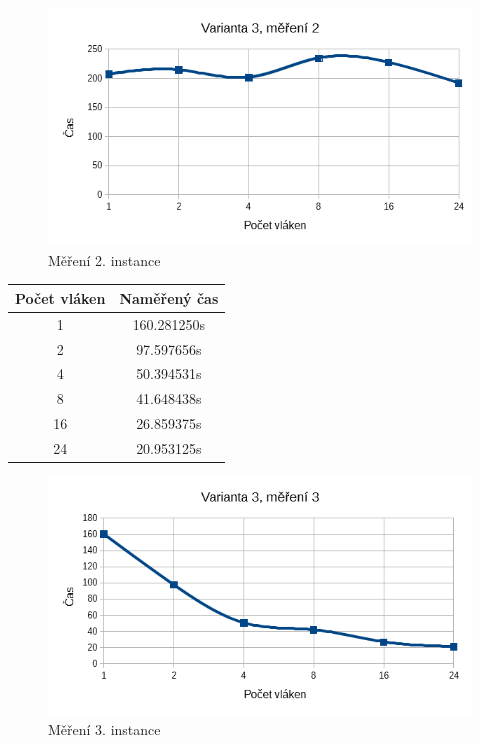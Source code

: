 \documentclass[12pt]{article}
\begin{document}
\begin{figure}[t]
  \begin{center}
      \includegraphics[width=12cm]{images/ssef2.png}
    \caption{Měření 2. instance} 
  \end{center}
\end{figure}




\begin{center}
\begin{tabular}{ c | c }
\textbf{Počet vláken} & \textbf{Naměřený čas} \\ \hline \hline 
1 & 160.281250s \\ \hline
2 & 97.597656s \\ \hline
4 & 50.394531s \\ \hline
8 & 41.648438s \\ \hline
16 & 26.859375s \\ \hline
24 & 20.953125s \\ \hline
\end{tabular}
\end{center}

\begin{figure}[t]
  \begin{center}
      \includegraphics[width=12cm]{images/ssef3.png}	
    \caption{Měření 3. instance} 
  \end{center}
\end{figure}
\end{document}
